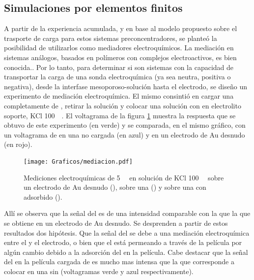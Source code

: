 	\subsection{Simulaciones por elementos finitos}	

		A partir de la experiencia acumulada, y en base al modelo propuesto sobre el trasporte de carga para estos sistemas preconcentradores, se planteó la posibilidad de utilizarlos como mediadores electroquímicos. 
    	La mediación en sistemas análogos, basados en polímeros con complejos electroactivos, es bien conocida.\cite{Kolb1993,Ybarra2005}. Por lo tanto, para determinar si son sistemas con la capacidad de transportar la carga de una sonda electroquímica (ya sea neutra, positiva o negativa), desde la interfase mesoporoso-solución hasta el electrodo, se diseño un experimento de mediación electroquímica. El mismo consintió en cargar una \pdmF\space completamente de \ru, retirar la solución y colocar una solución con \fc\space en electrolito soporte, KCl \SI{100}{\milli\Molar}. El voltagrama de la figura \ref{fig:mediacion} muestra la respuesta que se obtuvo de este experimento (en verde) y se comparada, en el mismo gráfico, con un voltagrama de \fc\space en una \pdmF\space no cargada (en azul) y en un electrodo de Au desnudo (en rojo).  

        	\begin{figure}[ht]	
					\centering
			 	    \texttt{[image: Graficos/mediacion.pdf]}
			        \caption[Voltagrama de \ru\space y \fc.]{Mediciones electroquímicas de \fc\space \SI{5}{\milli\Molar} en solución de KCl \SI{100}{\milli\Molar} sobre un electrodo de Au desnudo (\usebox{\rojo}), sobre una \pdmF\space (\usebox{\azul}) y sobre una \pdmF\space con \ru\space adsorbido (\usebox{\verde}).}
			        \label{fig:mediacion}
			      	\end{figure}

		Allí se observa que la señal del \fc\space es de una intensidad comparable con la que la que se obtiene en un electrodo de Au desnudo. Se desprenden a partir de estos resultados dos hipótesis. Que la señal del \fc\space se debe a una mediación electroquímica entre el \ru\space y el electrodo, o bien que el \fc\space está permeando a través de la película por algún cambio debido a la adsorción del \ru\space en la película. Cabe destacar que la señal del \fc\space en la película cargada de \ru\space es mucho mas intensa que la que corresponde a colocar \fc\space en una \pdmF\space sin \ru (voltagramas verde y azul respectivamente).

